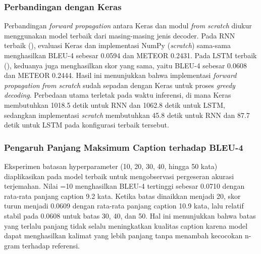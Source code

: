 \subsubsection{Perbandingan dengan Keras}
Perbandingan \textit{forward propagation} antara Keras dan modul \textit{from scratch} diukur menggunakan model terbaik dari masing-masing jenis decoder. Pada RNN terbaik (), evaluasi Keras dan implementasi NumPy (\textit{scratch}) sama-sama menghasilkan BLEU-4 sebesar 0.0594 dan METEOR 0.2431. Pada LSTM terbaik (), keduanya juga menghasilkan skor yang sama, yaitu BLEU-4 sebesar 0.0608 dan METEOR 0.2444. Hasil ini menunjukkan bahwa implementasi \textit{forward propagation} \textit{from scratch} sudah sepadan dengan Keras untuk proses \textit{greedy decoding}. Perbedaan utama terletak pada waktu inferensi, di mana Keras membutuhkan 1018.5 detik untuk RNN dan 1062.8 detik untuk LSTM, sedangkan implementasi \textit{scratch} membutuhkan 45.8 detik untuk RNN dan 87.7 detik untuk LSTM pada konfigurasi terbaik tersebut.

\subsubsection{Pengaruh Panjang Maksimum Caption terhadap BLEU-4}
Eksperimen batasan hyperparameter  (10, 20, 30, 40, hingga 50 kata) diaplikasikan pada model terbaik untuk mengobservasi pergeseran akurasi terjemahan. Nilai =10 menghasilkan BLEU-4 tertinggi sebesar 0.0710 dengan rata-rata panjang caption 9.2 kata. Ketika batas dinaikkan menjadi 20, skor turun menjadi 0.0609 dengan rata-rata panjang caption 10.9 kata, lalu relatif stabil pada 0.0608 untuk batas 30, 40, dan 50. Hal ini menunjukkan bahwa batas yang terlalu panjang tidak selalu meningkatkan kualitas caption karena model dapat menghasilkan kalimat yang lebih panjang tanpa menambah kecocokan n-gram terhadap referensi.
